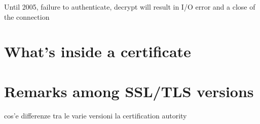 Until 2005, failure to authenticate, decrypt will result in I/O error and a
close of the connection

\section{What's inside a certificate \label{sec:ssl:x509}}

\section{Remarks among SSL/TLS versions}

cos'e
differenze tra le varie versioni
la certification autority
